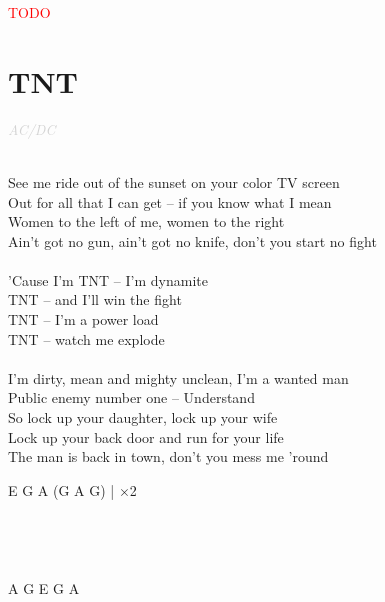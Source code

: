 \documentclass[a5paper, 10pt]{book}
\begin{document}
\begin{minipage}[t]{0.3\textwidth}
\textcolor{red}{TODO}\\
\end{minipage}

\newpage
\section{TNT}\textcolor{lightgray}{\textit{AC/DC}}\\~\\
\begin{minipage}[t]{0.7\textwidth}
See me ride out of the sunset on your color TV screen\\
Out for all that I can get – if you know what I mean\\
Women to the left of me, women to the right\\
Ain't got no gun, ain't got no knife, don't you start no fight\\
\\
\hspace*{5mm}'Cause I'm TNT – I'm dynamite \\
\hspace*{5mm}TNT – and I'll win the fight\\
\hspace*{5mm}TNT – I'm a power load\\
\hspace*{5mm}TNT – watch me explode\\
\\
I'm dirty, mean and mighty unclean, I'm a wanted man\\
Public enemy number one – Understand\\
So lock up your daughter, lock up your wife\\
Lock up your back door and run for your life\\
The man is back in town, don't you mess me 'round\\
\end{minipage}
\begin{minipage}[t]{0.3\textwidth}
 E G A (G A G) | $\times$2\\
 \\
 \\
 \\
 \\
A G E G A
\end{minipage}

\newpage
\end{document}
